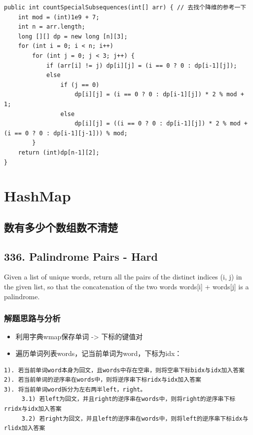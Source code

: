 \documentclass[9pt, b5paaper]{book}
\begin{document}
\begin{verbatim}
public int countSpecialSubsequences(int[] arr) { // 去找个降维的参考一下
    int mod = (int)1e9 + 7;
    int n = arr.length;
    long [][] dp = new long [n][3];
    for (int i = 0; i < n; i++) 
        for (int j = 0; j < 3; j++) {
            if (arr[i] != j) dp[i][j] = (i == 0 ? 0 : dp[i-1][j]);
            else 
                if (j == 0)
                    dp[i][j] = (i == 0 ? 0 : dp[i-1][j]) * 2 % mod + 1;
                else
                    dp[i][j] = ((i == 0 ? 0 : dp[i-1][j]) * 2 % mod + (i == 0 ? 0 : dp[i-1][j-1])) % mod;
        }
    return (int)dp[n-1][2];
}
\end{verbatim}

\chapter{HashMap}
\label{sec-3}
\section{数有多少个数组数不清楚}
\label{sec-3-1}
\section{336. Palindrome Pairs - Hard}
\label{sec-3-2}
Given a list of unique words, return all the pairs of the distinct indices (i, j) in the given list, so that the concatenation of the two words words[i] + words[j] is a palindrome.
\subsection{解题思路与分析}
\label{sec-3-2-1}
\begin{itemize}
\item 利用字典wmap保存单词 -> 下标的键值对
\item 遍历单词列表words，记当前单词为word，下标为idx：
\end{itemize}
\begin{verbatim}
1). 若当前单词word本身为回文，且words中存在空串，则将空串下标bidx与idx加入答案
2). 若当前单词的逆序串在words中，则将逆序串下标ridx与idx加入答案
3). 将当前单词word拆分为左右两半left，right。
     3.1) 若left为回文，并且right的逆序串在words中，则将right的逆序串下标rridx与idx加入答案
     3.2) 若right为回文，并且left的逆序串在words中，则将left的逆序串下标idx与rlidx加入答案
\end{verbatim}
\end{document}
